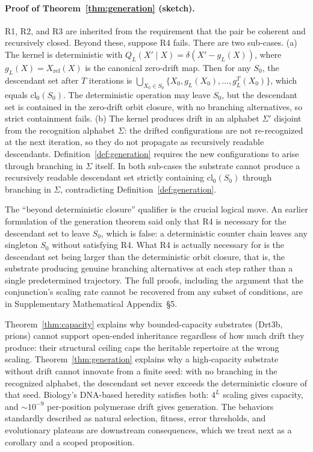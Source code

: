 \documentclass[aps,prx,reprint,amsmath,amssymb,floatfix,superscriptaddress,nofootinbib]{revtex4-2}
\theoremstyle{plain-thm}
\theoremstyle{definition-thm}
\begin{document}
\paragraph{Proof of Theorem~\ref{thm:generation} (sketch).} R1, R2, and R3 are inherited from the requirement that the pair be coherent and recursively closed. Beyond these, suppose R4 fails. There are two sub-cases. (a) The kernel is deterministic with $Q_L(X' \mid X) = \delta(X' - g_L(X))$, where $g_L(X) = X_{\mathrm{ref}}(X)$ is the canonical zero-drift map. Then for any $S_0$, the descendant set after $T$ iterations is $\bigcup_{X_0 \in S_0} \{X_0, g_L(X_0), \ldots, g_L^T(X_0)\}$, which equals $\mathrm{cl}_0(S_0)$. The deterministic operation may leave $S_0$, but the descendant set is contained in the zero-drift orbit closure, with no branching alternatives, so strict containment fails. (b) The kernel produces drift in an alphabet $\Sigma'$ disjoint from the recognition alphabet $\Sigma$: the drifted configurations are not re-recognized at the next iteration, so they do not propagate as recursively readable descendants. Definition~\ref{def:generation} requires the new configurations to arise through branching in $\Sigma$ itself. In both sub-cases the substrate cannot produce a recursively readable descendant set strictly containing $\mathrm{cl}_0(S_0)$ through branching in $\Sigma$, contradicting Definition~\ref{def:generation}.

The ``beyond deterministic closure'' qualifier is the crucial logical move. An earlier formulation of the generation theorem said only that R4 is necessary for the descendant set to leave $S_0$, which is false: a deterministic counter chain leaves any singleton $S_0$ without satisfying R4. What R4 is actually necessary for is the descendant set being larger than the deterministic orbit closure, that is, the substrate producing genuine branching alternatives at each step rather than a single predetermined trajectory. The full proofs, including the argument that the conjunction's scaling rate cannot be recovered from any subset of conditions, are in Supplementary Mathematical Appendix~\S5.

Theorem~\ref{thm:capacity} explains why bounded-capacity substrates (Drt3b, prions) cannot support open-ended inheritance regardless of how much drift they produce: their structural ceiling caps the heritable repertoire at the wrong scaling. Theorem~\ref{thm:generation} explains why a high-capacity substrate without drift cannot innovate from a finite seed: with no branching in the recognized alphabet, the descendant set never exceeds the deterministic closure of that seed. Biology's DNA-based heredity satisfies both: $4^L$ scaling gives capacity, and $\sim 10^{-9}$ per-position polymerase drift gives generation. The behaviors standardly described as natural selection, fitness, error thresholds, and evolutionary plateaus are downstream consequences, which we treat next as a corollary and a scoped proposition.
\end{document}
